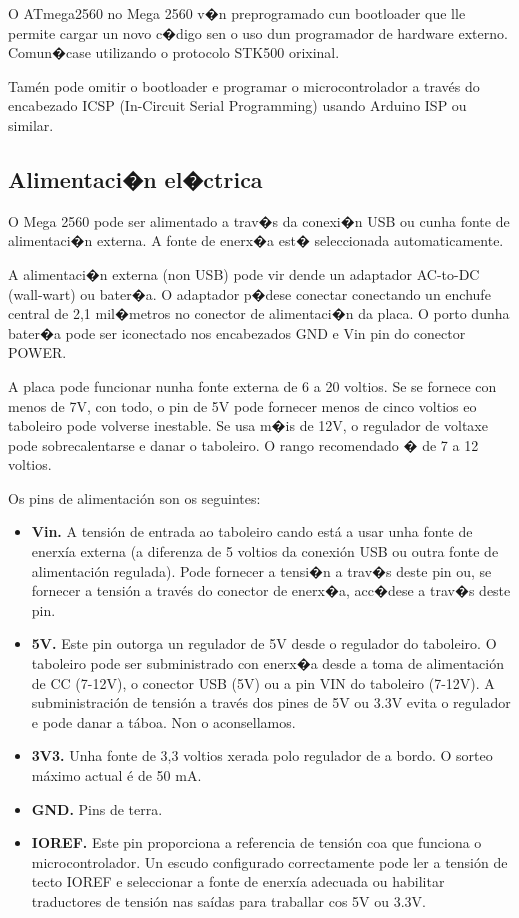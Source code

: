\documentclass[11pt,twoside]{book}
\begin{document}
O ATmega2560 no Mega 2560 v�n preprogramado cun bootloader que lle permite cargar un novo c�digo sen o uso dun programador de hardware externo. Comun�case utilizando o protocolo STK500 orixinal.

Tamén pode omitir o bootloader e programar o microcontrolador a través do encabezado ICSP (In-Circuit Serial Programming) usando Arduino ISP ou similar.

\subsection{Alimentaci�n el�ctrica}

O Mega 2560 pode ser alimentado a trav�s da conexi�n USB ou cunha fonte de alimentaci�n externa. A fonte de enerx�a est� seleccionada automaticamente. 

A alimentaci�n externa (non USB) pode vir dende un adaptador AC-to-DC (wall-wart) ou bater�a. O adaptador p�dese conectar conectando un enchufe central de 2,1 mil�metros no conector de alimentaci�n da placa. O porto dunha bater�a pode ser iconectado nos encabezados GND e Vin pin do conector POWER. 

A placa pode funcionar nunha fonte externa de 6 a 20 voltios. Se se fornece con menos de 7V, con todo, o pin de 5V pode fornecer menos de cinco voltios eo taboleiro pode volverse inestable. Se usa m�is de 12V, o regulador de voltaxe pode sobrecalentarse e danar o taboleiro. O rango recomendado � de 7 a 12 voltios.

Os pins de alimentación son os seguintes:

\begin{itemize}
\item \textbf{Vin.} A tensión de entrada ao taboleiro cando está a usar unha fonte de enerxía externa (a diferenza de 5 voltios da conexión USB ou outra fonte de alimentación regulada). Pode fornecer a tensi�n a trav�s deste pin ou, se fornecer a tensión a través do conector de enerx�a, acc�dese a trav�s deste pin.
\item \textbf{5V.} Este pin outorga un regulador de 5V desde o regulador do taboleiro. O taboleiro pode ser subministrado con enerx�a desde a toma de alimentación de CC (7-12V), o conector USB (5V) ou a pin VIN do taboleiro (7-12V). A subministración de tensión a través dos pines de 5V ou 3.3V evita o regulador e pode danar a táboa. Non o aconsellamos.
\item \textbf{3V3.} Unha fonte de 3,3 voltios xerada polo regulador de a bordo. O sorteo máximo actual é de 50 mA.
\item \textbf{GND.} Pins de terra.
\item \textbf{IOREF.} Este pin proporciona a referencia de tensión coa que funciona o microcontrolador. Un escudo configurado correctamente pode ler a tensión de tecto IOREF e seleccionar a fonte de enerxía adecuada ou habilitar traductores de tensión nas saídas para traballar cos 5V ou 3.3V.
\end{itemize}
\end{document}
